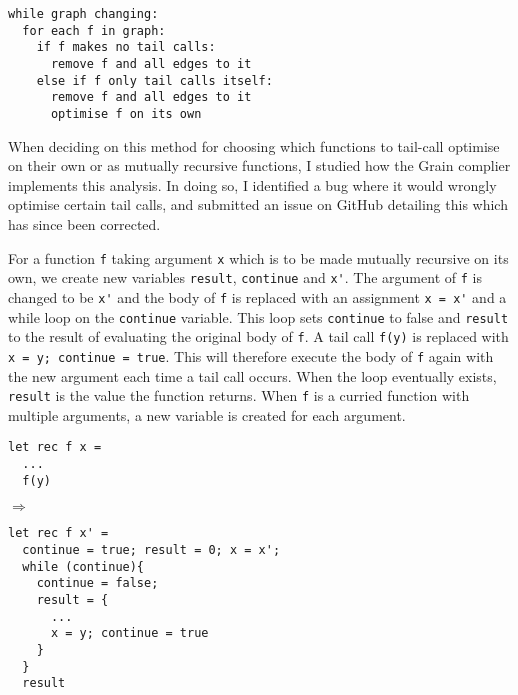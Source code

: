 \begin{verbatim}
while graph changing:
  for each f in graph:
    if f makes no tail calls:
      remove f and all edges to it
    else if f only tail calls itself:
      remove f and all edges to it
      optimise f on its own
\end{verbatim}

When deciding on this method for choosing which functions to tail-call optimise on their own or as mutually recursive functions, I studied how the Grain complier implements this analysis. In doing so, I identified a bug where it would wrongly optimise certain tail calls, and submitted an issue on GitHub detailing this which has since been corrected. %

For a function \verb|f| taking argument \verb|x| which is to be made mutually recursive on its own, we create new variables \verb|result|, \verb|continue| and \verb|x'|. The argument of \verb|f| is changed to be \verb|x'| and the body of \verb|f| is replaced with an assignment \verb|x = x'| and a while loop on the \verb|continue| variable. This loop sets \verb|continue| to false and \verb|result| to the result of evaluating the original body of \verb|f|. A tail call \verb|f(y)| is replaced with \verb|x = y; continue = true|. This will therefore execute the body of \verb|f| again with the new argument each time a tail call occurs. When the loop eventually exists, \verb|result| is the value the function returns. When \verb|f| is a curried function with multiple arguments, a new variable is created for each argument.

\begin{minipage}{0.3\textwidth}
\begin{verbatim}
let rec f x = 
  ...
  f(y)
\end{verbatim}
\end{minipage}
\hfill $\Longrightarrow$ \hfill
\begin{minipage}{0.6\textwidth}
\begin{verbatim}
let rec f x' = 
  continue = true; result = 0; x = x';
  while (continue){
    continue = false;
    result = {
      ...
      x = y; continue = true
    }
  }
  result
\end{verbatim}
\end{minipage}

